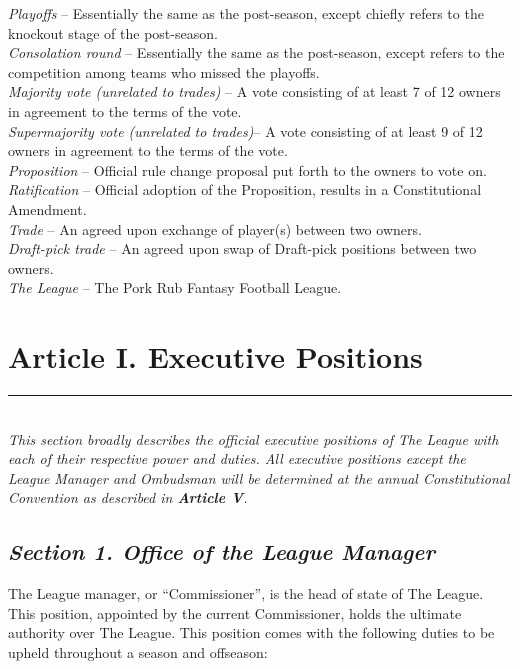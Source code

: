 \documentclass{article}
\begin{document}
    \noindent\textit{Playoffs} – Essentially the same as the post-season, except chiefly refers to the knockout stage of the post-season.\\

    \noindent\textit{Consolation round} – Essentially the same as the post-season, except refers to the competition among teams who missed the playoffs.\\

    \noindent\textit{Majority vote (unrelated to trades)} – A vote consisting of at least 7 of 12 owners in agreement to the terms of the vote.\\

    \noindent\textit{Supermajority vote (unrelated to trades)}– A vote consisting of at least 9 of 12 owners in agreement to the terms of the vote.\\

    \noindent\textit{Proposition} – Official rule change proposal put forth to the owners to vote on.\\

    \noindent\textit{Ratification} – Official adoption of the Proposition, results in a Constitutional Amendment.\\

    \noindent\textit{Trade} – An agreed upon exchange of player(s) between two owners.\\

    \noindent\textit{Draft-pick trade} – An agreed upon swap of Draft-pick positions between two owners.\\

    \noindent\textit{The League} – The Pork Rub Fantasy Football League.\\

\section{Article I. Executive Positions}
    \noindent\rule{\textwidth}{0.5pt}\\

    \noindent\textit{This section broadly describes the official executive positions of The League with each of their respective power and duties. All executive positions except the League Manager and Ombudsman will be determined at the annual Constitutional Convention as described in \textbf{Article V}.}
    \subsection{\textit{Section 1. Office of the League Manager}}
    The League manager, or “Commissioner”, is the head of state of The League. This position, appointed by the current Commissioner, holds the ultimate authority over The League. This position comes with the following duties to be upheld throughout a season and offseason:\\
\end{document}
